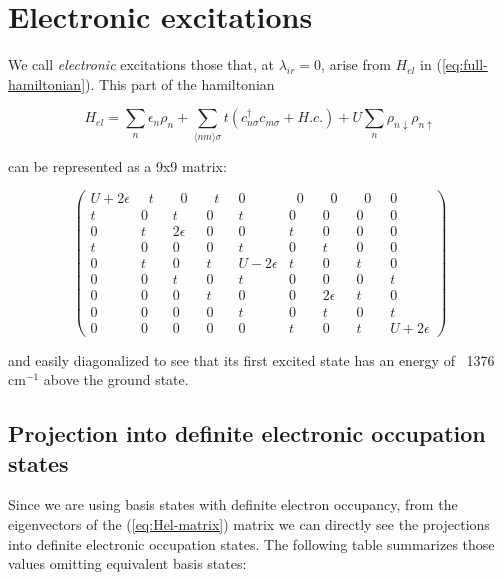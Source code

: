 \chapter{Electronic excitations}

We call \textit{electronic} excitations those that, at $\lambda_{ir}=0$, arise from $H_{el}$ in (\ref{eq:full-hamiltonian}). This part of the hamiltonian

\begin{equation}\label{eq:Hel} H_{el} = \sum_n \epsilon_n \rho_n + \sum_{ \langle nm \rangle \sigma } t (c_{n \sigma }^\dagger c_{m \sigma } + H.c.) + U\sum_n \rho_{n\downarrow}\rho_{n\uparrow} \end{equation}

can be represented  as a 9x9 matrix:

\begin{equation}\label{eq:Hel-matrix} \left( \begin{array}{ccccccccc} 
U+2\epsilon &\;\;t\;\;&\;\;0\;\;&\;\;t\;\;&0&\;\;0\;\;&\;\;0\;\;&\;\;0\;\;&0 \\
t&0&t&0&t&0&0&0&0 \\
0&t&2\epsilon &0&0&t&0&0&0 \\
t&0&0&0&t&0&t&0&0 \\
0&t&0&t&U-2\epsilon &t&0&t&0 \\
0&0&t&0&t&0&0&0&t \\
0&0&0&t&0&0&2\epsilon &t&0 \\
0&0&0&0&t&0&t&0&t \\
0&0&0&0&0&t&0&t&U+2\epsilon  \end{array} \right)\end{equation}

and easily diagonalized to see that its first excited state has an energy of ~1376 cm$^{-1}$ above the  ground state.


\section{Projection into definite electronic occupation states}

Since we are using basis states with definite electron occupancy, from the eigenvectors of the (\ref{eq:Hel-matrix}) matrix we can directly see the projections into definite electronic occupation states. The following table summarizes those values omitting equivalent basis states:

